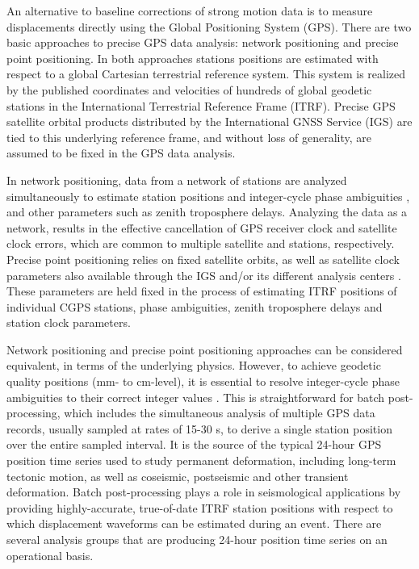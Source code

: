 An alternative to baseline corrections of strong motion data is to measure displacements directly using the  Global Positioning System (GPS). There are two basic approaches to precise GPS data analysis: network positioning and precise point positioning. In both approaches stations positions are estimated with respect to a global Cartesian terrestrial reference system. This system is realized by the published coordinates and velocities of hundreds of global geodetic stations in the International Terrestrial Reference Frame (ITRF). Precise GPS satellite orbital products distributed by the International GNSS Service (IGS) are tied to this underlying reference frame, and without loss of generality, are assumed to be fixed in the GPS data analysis. 

In network positioning, data from a network of stations are analyzed simultaneously to estimate station positions and integer-cycle phase ambiguities \citep{Dong1989,Blewitt1989}, and other parameters such as zenith troposphere delays. Analyzing the data as a network, results in the effective cancellation of GPS receiver clock and satellite clock errors, which are common to multiple satellite and stations, respectively. Precise point positioning \citep{Zumberge1997} relies on fixed satellite orbits, as well as satellite clock parameters also available through the IGS and/or its different analysis centers . These parameters are held fixed in the process of estimating ITRF positions of individual CGPS stations, phase ambiguities, zenith troposphere delays and station clock parameters.

Network positioning and precise point positioning approaches can be considered equivalent, in terms of the underlying physics. However, to achieve geodetic quality positions (mm- to cm-level), it is essential to resolve integer-cycle phase ambiguities to their correct integer values \citep{Blewitt1989,Dong1989}. This is straightforward for batch post-processing, which includes the simultaneous analysis of multiple GPS data records, usually sampled at rates of 15-30 s, to derive a single station position over the entire sampled interval. It is the source of the typical 24-hour GPS position time series used to study permanent deformation, including long-term tectonic motion, as well as coseismic, postseismic and other transient deformation. Batch post-processing plays a role in seismological applications by providing highly-accurate, true-of-date ITRF station positions with respect to which displacement waveforms can be estimated during an event. There are several analysis groups that are producing 24-hour position time series on an operational basis.

